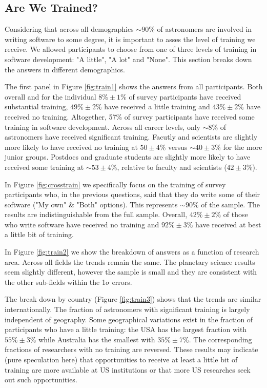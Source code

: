 \subsection{Are We Trained?}

Considering that across all demographics $\sim90\%$ of astronomers are involved in writing software to some degree, it is important to asses the level of training we receive. We allowed participants to choose from one of three levels of training in software development: "A little", "A lot" and "None". This section breaks down the answers in different demographics. 

The first panel in Figure \ref{fig:train1} shows the answers from all participants. Both overall and for the individual  $8\%\pm1\%$ of survey participants have received substantial training, $49\%\pm2\%$ have received a little training and $43\%\pm2\%$ have received no training. Altogether, 57\% of survey participants have received some training in software development. Across all career levels, only $\sim8\%$ of astronomers have received significant training. Facutly and scientists are slightly more likely to have received no training at $50\pm4\%$ versus $\sim40\pm3\%$ for the more junior groups. Postdocs and graduate students are slightly more likely to have received some training at $\sim53\pm4\%$, relative to faculty and scientists ($42\pm3\%$).

In Figure \ref{fig:crosstrain} we specifically focus on the training of survey participants who, in the previous questions, said that they do write some of their software ("My own" & "Both" options). This represents $\sim90\%$ of the sample. The results are indistinguishable from the full sample. Overall, $42\%\pm2\%$ of those who write software have received no training and $92\%\pm3\%$ have received at best a little bit of training.

In Figure \ref{fig:train2} we show the breakdown of answers as a function of research area. Across all fields the trends remain the same. The planetary science results seem slightly different, however the sample is small and they are consistent with the other sub-fields within the 1$\sigma$ errors. 

The break down by country (Figure \ref{fig:train3}) shows that the trends are similar internationally. The fraction of astronomers with significant training is largely independent of geography. Some geographical variations exist in the fraction of participants who have a little training: the USA has the largest fraction with $55\%\pm3\%$ while Australia has the smallest with $35\%\pm7\%$. The corresponding fractions of researchers with no training are reversed. These results may indicate (pure speculation here) that opportunities to receive at least a little bit of training are more available at US institutions or that more US researches seek out such opportunities. 

